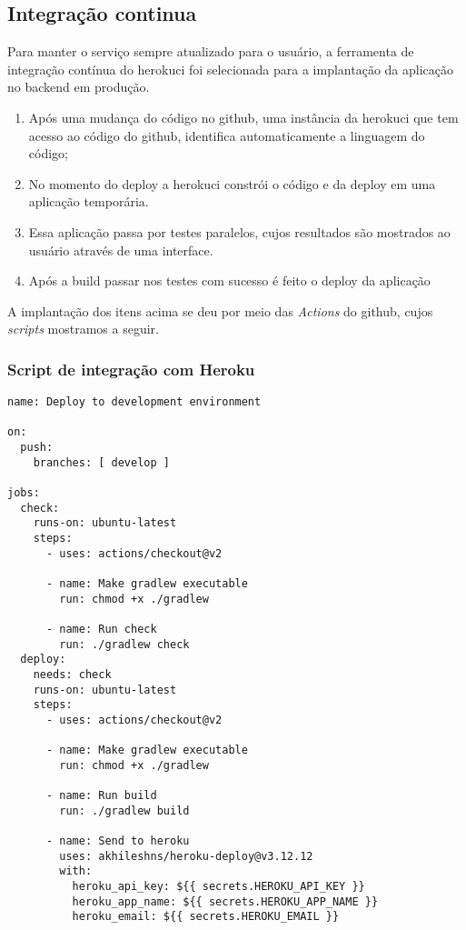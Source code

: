 \subsection{Integração continua}
Para manter o serviço sempre atualizado para o usuário, a ferramenta de integração contínua do \gls{herokuci} foi selecionada para a implantação da aplicação no \gls{backend} em produção.

\begin{enumerate}
    \item Após uma mudança do código no \gls{github}, uma instância da \gls{herokuci} que tem acesso ao código do \gls{github}, identifica automaticamente
    a linguagem do código; 
    \item No momento do \gls{deploy} a \gls{herokuci} constrói o código e da \gls{deploy} em uma aplicação temporária.
    \item Essa aplicação passa por testes paralelos, cujos resultados são mostrados ao usuário através de uma interface.
    \item Após a build passar nos testes com sucesso é feito o \gls{deploy} da aplicação 
\end{enumerate} 

A implantação dos itens acima se deu por meio das \emph{Actions} do \gls{github}, cujos \emph{scripts} mostramos a seguir.

\subsubsection{Script de integração com Heroku}
\begin{verbatim}
name: Deploy to development environment

on:
  push:
    branches: [ develop ]

jobs:
  check:
    runs-on: ubuntu-latest
    steps:
      - uses: actions/checkout@v2
      
      - name: Make gradlew executable
        run: chmod +x ./gradlew

      - name: Run check
        run: ./gradlew check
  deploy:
    needs: check
    runs-on: ubuntu-latest
    steps:
      - uses: actions/checkout@v2
      
      - name: Make gradlew executable
        run: chmod +x ./gradlew

      - name: Run build
        run: ./gradlew build

      - name: Send to heroku
        uses: akhileshns/heroku-deploy@v3.12.12
        with:
          heroku_api_key: ${{ secrets.HEROKU_API_KEY }}
          heroku_app_name: ${{ secrets.HEROKU_APP_NAME }}
          heroku_email: ${{ secrets.HEROKU_EMAIL }}
\end{verbatim}

